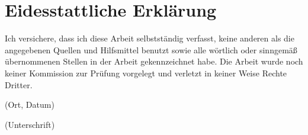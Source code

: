 {}
\chapter*{Eidesstattliche Erklärung}

Ich versichere, dass ich diese Arbeit selbstständig verfasst, keine anderen als die angegebenen Quellen und Hilfsmittel benutzt sowie alle wörtlich oder sinngemäß übernommenen Stellen in der Arbeit gekennzeichnet habe.
Die Arbeit wurde noch keiner Kommission zur Prüfung vorgelegt und verletzt in keiner Weise Rechte Dritter.

\begin{multicols}{2}
\underline{\hspace{5cm}}

(Ort, Datum)

\underline{\hspace{5cm}}

(Unterschrift)
\end{multicols}
